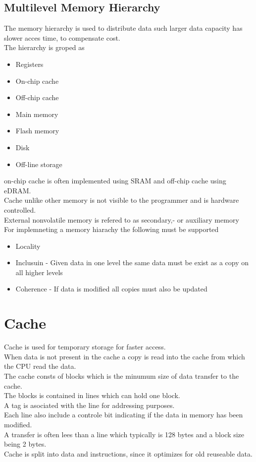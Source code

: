 \documentclass[12pt, a4paper]{article}
\begin{document}
		\subsection{Multilevel Memory Hierarchy}
			The memory hierarchy is used to distribute data such larger data capacity has slower acces time, to compensate cost.\\
			 The hierarchy is groped as
			 \begin{itemize}
			 	\item Registers
			 	\item On-chip cache
			 	\item Off-chip cache
			 	\item Main memory
			 	\item Flash memory
			 	\item Disk
			 	\item Off-line storage
			\end{itemize}
			on-chip cache is often implemented using SRAM and off-chip cache using eDRAM.\\
			Cache unlike other memory is not visible to the programmer and is hardware controlled.\\
			External nonvolatile memory is refered to as secondary,- or auxiliary memory\\
			For implemneting a memory hiarachy the following must be supported
			\begin{itemize}
				\item Locality 
				\item Inclusuin - Given data in one level the same data must be exist as a copy on all higher levels
				\item Coherence - If data is modified all copies must also be updated
			\end{itemize}
	\section{Cache}
		Cache is used for temporary storage for faster access.\\
		When data is not present in the cache a copy is read into the cache from which the CPU read the data.\\
		The cache consts of blocks which is the minumum size of data transfer to the cache.\\
		The blocks is contained in lines which can hold one block.\\
		A tag is asociated with the line for addressing purposes.\\
		Each line also include a controle bit indicating if the data in memory has been modified.\\
		A transfer is often lees than a line which typically is 128 bytes and a block size being 2 bytes.\\
		Cache is split into data and instructions, since it optimizes for old reuseable data.
\end{document}
